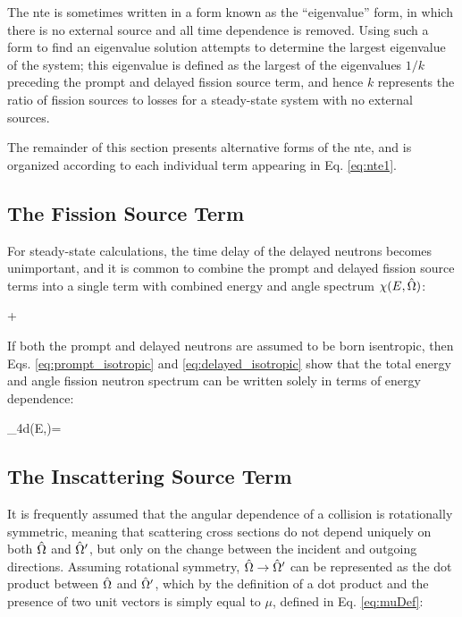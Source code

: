 The \gls{nte} is sometimes written in a form known as the ``eigenvalue'' form, in which there is no external source and all time dependence is removed. Using such a form to find an eigenvalue solution attempts to determine the largest eigenvalue of the system; this eigenvalue is defined as the largest of the eigenvalues \(1/k\) preceding the prompt and delayed fission source term, and hence \(k\) represents the ratio of fission sources to losses for a steady-state system with no external sources.

The remainder of this section presents alternative forms of the \gls{nte}, and is organized according to each individual term appearing in Eq. \eqref{eq:nte1}.

\subsection{The Fission Source Term}

For steady-state calculations, the time delay of the delayed neutrons becomes unimportant, and it is common to combine the prompt and delayed fission source terms into a single term with combined energy and angle spectrum \(\chi(E,\hat{\Omega})\):

\beqa
\promptfissionsource\psi\seatprime+\delayedfissionsource\rightarrow\\
\totalfissionsource\psi\seatprime
\eeqa

If both the prompt and delayed neutrons are assumed to be born isentropic, then Eqs. \eqref{eq:prompt_isotropic} and \eqref{eq:delayed_isotropic} show that the total energy and angle fission neutron spectrum can be written solely in terms of energy dependence:

\beq
\int_{4\pi}d\hO\chi(E,\hO)=
\eeq

\subsection{The Inscattering Source Term}

It is frequently assumed that the angular dependence of a collision is rotationally symmetric, meaning that scattering cross sections do not depend uniquely on both \(\hat{\Omega}\) and \(\hat{\Omega}'\), but only on the change between the incident and outgoing directions. Assuming rotational symmetry, \(\hat{\Omega}\rightarrow\hat{\Omega}'\) can be represented as the dot product between \(\hat{\Omega}\) and \(\hat{\Omega}'\), which by the definition of a dot product and the presence of two unit vectors is simply equal to \(\mu\), defined in Eq. \eqref{eq:muDef}:

